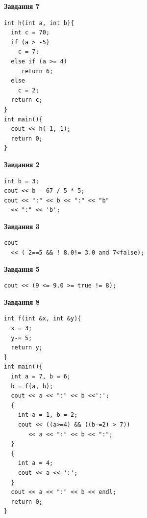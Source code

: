 \documentclass[12pt, ukrainian]{article}
\begin{document}
{\begin {large}
\begin{minipage}[t]{7.0cm}
\begin{center}
\textbf{Завдання 7}
\end{center}
\vspace{-8mm}

\begin{verbatim}
int h(int a, int b){
  int c = 70;
  if (a > -5)
    c = 7;
  else if (a >= 4)
     return 6;
  else
    c = 2;
  return c;
}
int main(){
  cout << h(-1, 1);
  return 0;
}
\end{verbatim}

\end{minipage}
\vline \hspace{1mm}
\begin{minipage}[t]{11.0cm}

\begin{center}
\textbf{Завдання 2}
\end{center}
\vspace{-8mm}

\begin{verbatim}
int b = 3;
cout << b - 67 / 5 * 5;
cout << ":" << b << ":" << "b" 
  << ":" << 'b';
\end{verbatim}



\begin{center}
\textbf{Завдання 3}
\end{center}
\vspace{-8mm}

\begin{verbatim}
cout 
  << ( 2==5 && ! 8.0!= 3.0 and 7<false);
\end{verbatim}



\begin{center}
\textbf{Завдання 5}
\end{center}
\vspace{-8mm}

\begin{verbatim}
cout << (9 <= 9.0 >= true != 8);
\end{verbatim}



\begin{center}
\textbf{Завдання 8}
\end{center}
\vspace{-8mm}

\begin{verbatim}
int f(int &x, int &y){
  x = 3;
  y-= 5;
  return y;
}
int main(){
  int a = 7, b = 6;
  b = f(a, b);
  cout << a << ":" << b <<':';
  {
    int a = 1, b = 2;
    cout << ((a>=4) && ((b-=2) > 7))
       << a << ":" << b << ":";
  }
  {
    int a = 4;
    cout << a << ':';
  }
  cout << a << ":" << b << endl;
  return 0;
}
\end{verbatim}


\end{minipage}
\end{large}}
\end{document}

